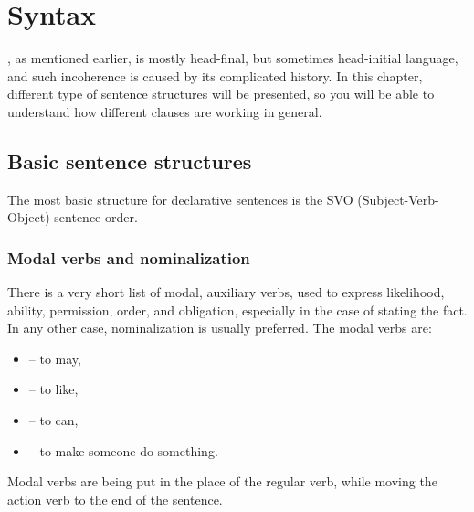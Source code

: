 \chapter{Syntax}
\label{ch:syntax}

\andro, as mentioned earlier, is mostly head-final, but sometimes head-initial
language, and such incoherence is caused by its complicated history. In this
chapter, different type of sentence structures will be presented, so you will be
able to understand how different clauses are working in general.

\section{Basic sentence structures}
\label{sec:basic}

The most basic structure for declarative sentences is the SVO
(Subject-Verb-Object) sentence order.


\subsection{Modal verbs and nominalization}

There is a very short list of modal, auxiliary verbs, used to express
likelihood, ability, permission, order, and obligation, especially in the case
of stating the fact. In any other case, nominalization is usually preferred. The
modal verbs are:

\begin{itemize}
    \item {} -- to may,
    \item {} -- to like,
    \item {} -- to can,
    \item {} -- to make someone do something.
\end{itemize}



Modal verbs are being put in the place of the regular verb, while moving the
action verb to the end of the sentence.


